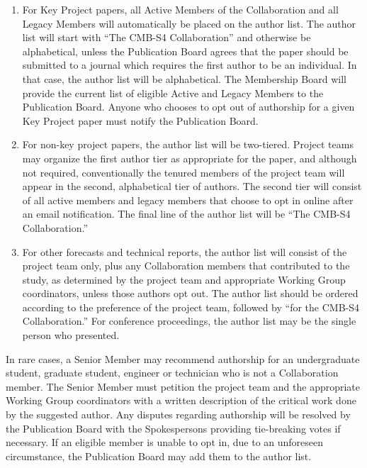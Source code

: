 \documentclass[12pt]{article}
\begin{document}
\begin{enumerate}
\item For Key Project papers, all Active Members of the Collaboration and all Legacy Members will automatically be placed on the author list.  The author list will start with ``The CMB-S4 Collaboration'' and otherwise be alphabetical, unless the Publication Board agrees that the paper should be submitted to a journal which requires the first author to be an individual.  In that case, the author list will be alphabetical.
  The Membership Board will provide the current list of eligible Active and Legacy Members to the Publication Board.
  {\color{red} Anyone who chooses to opt out of authorship for a given Key Project paper must  notify the Publication Board.}
\item For non-key project papers, the author list will be two-tiered.
  Project teams may organize the first author tier as appropriate for the paper, and although not required, conventionally the tenured members of the project team will appear in the second, alphabetical tier of authors.
  The second tier will consist of all active members and legacy members that choose to opt in online after an email notification.  The final line of the author list will be ``The CMB-S4 Collaboration.''
  \item For other forecasts and technical reports, the author list will consist of the project team only, plus any Collaboration members that contributed to the study, as determined by the project team and appropriate Working Group coordinators, unless those authors opt out.  The author list should be ordered according to the preference of the project team, followed by ``for the CMB-S4 Collaboration.''  For conference proceedings, the author list may be the single person who presented.
\end{enumerate}

In rare cases, a Senior Member may recommend authorship for an undergraduate student, graduate student, engineer or technician who is not a Collaboration member.  The Senior Member must petition the project team and the appropriate Working Group coordinators with a written description of the critical work done by the suggested author. 
Any disputes regarding authorship will be resolved by the Publication Board with the Spokespersons providing  tie-breaking votes if necessary.  If an eligible member is unable to opt in, due to an unforeseen circumstance, the Publication Board may add them to the author list.
\end{document}
